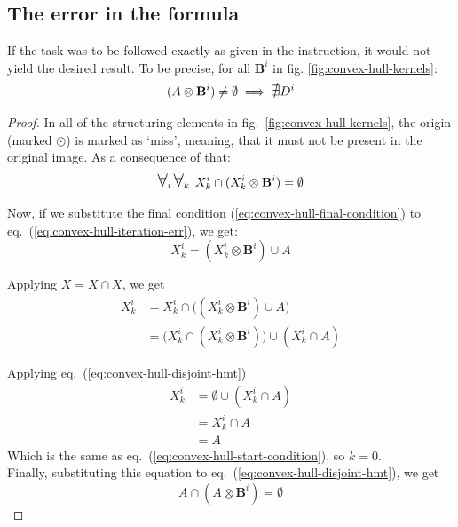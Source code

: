 \documentclass[12pt]{article}
\begin{document}
\pagebreak[4]
\subsection*{The error in the formula}

If the task was to be followed exactly as given in the instruction, it would not yield the desired result.
To be precise, for all $\mathbf{B}^i$ in fig. \ref{fig:convex-hull-kernels}:
\begin{equation*}
    (A \otimes \mathbf{B}^i) \neq \emptyset \implies \mbox{\large$\mathsurround0pt\nexists$} D^i
\end{equation*}

\begin{proof}
    In all of the structuring elements in fig.~\ref{fig:convex-hull-kernels}, the origin (marked $\odot$) is marked as `miss', meaning, that it must not be present in the original image.
    As a consequence of that:
    \begin{equation}
        \biggerforall\nolimits_i\biggerforall\nolimits_k \; X^i_k \cap (X^i_k \otimes \mathbf{B}^i) = \emptyset
        \label{eq:convex-hull-disjoint-hmt}
    \end{equation}

    Now, if we substitute the final condition (\ref{eq:convex-hull-final-condition}) to eq.~(\ref{eq:convex-hull-iteration-err}), we get:
    \begin{equation}
        X^i_k = (X^i_k \otimes \mathbf{B}^i) \cup A
        \label{eq:convex-hull-iteration-error-substituted}
    \end{equation}

    Applying $X = X \cap X$, we get
    \begin{align}
        X^i_k & = X^i_k \cap \big((X^i_k \otimes \mathbf{B}^i) \cup A \big) \nonumber\\
              & = \big(X^i_k \cap (X^i_k \otimes \mathbf{B}^i) \big) \cup (X^i_k \cap A)
    \end{align}

    Applying eq.~(\ref{eq:convex-hull-disjoint-hmt})
    \begin{align}
        X^i_k &= \emptyset \cup (X^i_k \cap A) \nonumber \\
        &= X^i_k \cap A \nonumber \\
        &= A \label{eq:convex-hull-only-zero-k}
    \end{align}
    Which is the same as eq.~(\ref{eq:convex-hull-start-condition}), so $k=0$.\\
    Finally, substituting this equation to eq.~(\ref{eq:convex-hull-disjoint-hmt}), we get
    \begin{equation}
        A \cap (A \otimes \mathbf{B}^i) = \emptyset
    \end{equation}


\end{proof}
\end{document}
